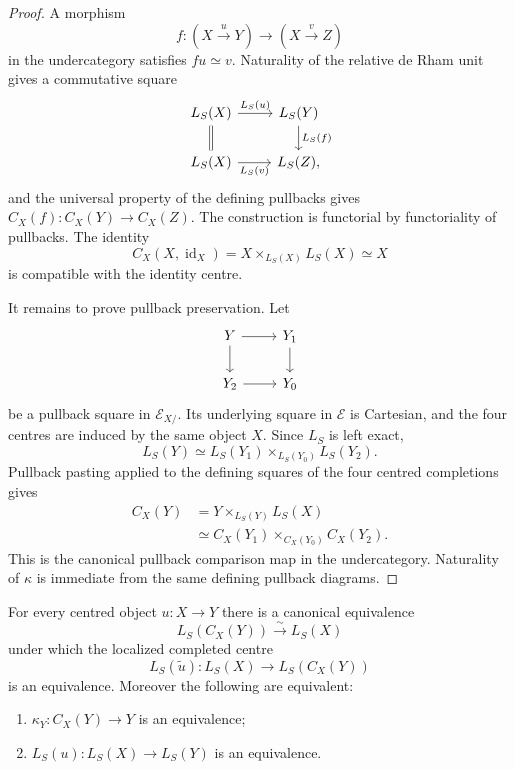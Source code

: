 \begin{proof}
A morphism
\[
    f:(X\xrightarrow{u}Y)\longrightarrow(X\xrightarrow{v}Z)
\]
in the undercategory satisfies $fu\simeq v$.  Naturality of the relative
de Rham unit gives a commutative square
\[
\begin{tikzcd}
L_S(X) \arrow[r,"L_S(u)"] \arrow[d,equal] &
L_S(Y) \arrow[d,"L_S(f)"]\\
L_S(X) \arrow[r,"L_S(v)"'] &
L_S(Z),
\end{tikzcd}
\]
and the universal property of the defining pullbacks gives
$C_X(f):C_X(Y)\to C_X(Z)$.  The construction is functorial by functoriality
of pullbacks.  The identity
\[
    C_X(X,\operatorname{id}_X)
    =
    X\times_{L_S(X)}L_S(X)
    \simeq X
\]
is compatible with the identity centre.

It remains to prove pullback preservation.  Let
\[
\begin{tikzcd}
Y \arrow[r] \arrow[d] &
Y_1 \arrow[d]\\
Y_2 \arrow[r] &
Y_0
\end{tikzcd}
\]
be a pullback square in $\mathcal E_{X/}$.  Its underlying square in
$\mathcal E$ is Cartesian, and the four centres are induced by the same
object $X$.  Since $L_S$ is left exact,
\[
    L_S(Y)
    \simeq
    L_S(Y_1)\times_{L_S(Y_0)}L_S(Y_2).
\]
Pullback pasting applied to the defining squares of the four centred
completions gives
\[
\begin{aligned}
    C_X(Y)
    &=
    Y\times_{L_S(Y)}L_S(X)\\
    &\simeq
    C_X(Y_1)\times_{C_X(Y_0)}C_X(Y_2).
\end{aligned}
\]
This is the canonical pullback comparison map in the undercategory.
Naturality of $\kappa$ is immediate from the same defining pullback diagrams.
\end{proof}

\begin{proposition}
\label{prop:centred-completion-recognition}
For every centred object $u:X\to Y$ there is a canonical equivalence
\[
    L_S(C_X(Y))
    \xrightarrow{\sim}
    L_S(X)
\]
under which the localized completed centre
\[
    L_S(\widetilde u):
    L_S(X)\longrightarrow L_S(C_X(Y))
\]
is an equivalence.  Moreover the following are equivalent:
\begin{enumerate}
    \item $\kappa_Y:C_X(Y)\to Y$ is an equivalence;
    \item $L_S(u):L_S(X)\to L_S(Y)$ is an equivalence.
\end{enumerate}
\end{proposition}


